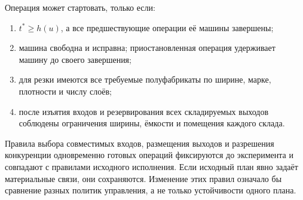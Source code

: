 Операция может стартовать, только если:
\begin{enumerate}
  \item $t^{*}\geq h(u)$, а все предшествующие операции её машины завершены;
  \item машина свободна и исправна; приостановленная операция удерживает машину до своего завершения;
  \item для резки имеются все требуемые полуфабрикаты по ширине, марке, плотности и числу слоёв;
  \item после изъятия входов и резервирования всех складируемых выходов соблюдены ограничения ширины, ёмкости и помещения каждого склада.
\end{enumerate}
Правила выбора совместимых входов, размещения выходов и разрешения конкуренции одновременно готовых операций фиксируются до эксперимента и совпадают с правилами исходного исполнения. Если исходный план явно задаёт материальные связи, они сохраняются. Изменение этих правил означало бы сравнение разных политик управления, а не только устойчивости одного плана.

